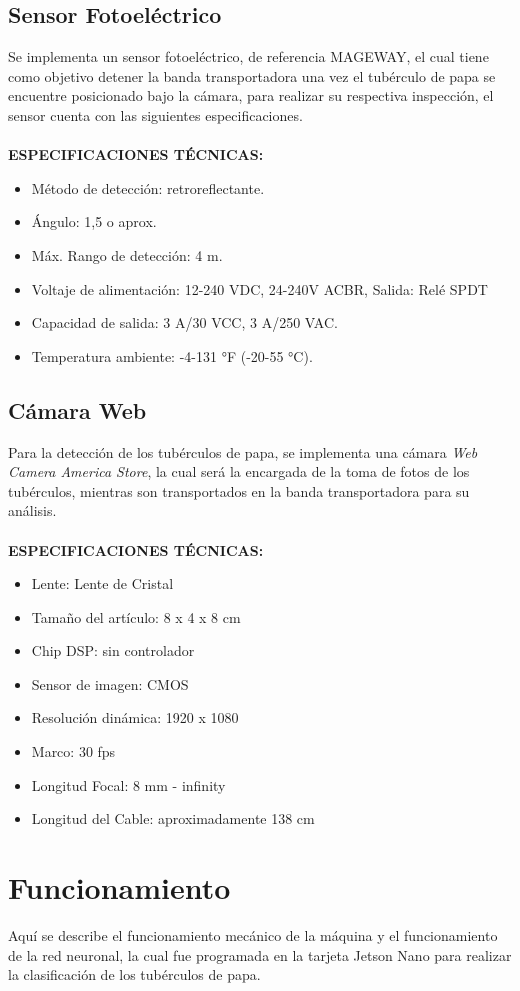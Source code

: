 \subsection{Sensor Fotoeléctrico}
Se implementa un sensor fotoeléctrico, de referencia MAGEWAY, el cual tiene como objetivo detener la banda transportadora una vez el tubérculo de papa se encuentre posicionado bajo la cámara, para realizar su respectiva inspección, el sensor cuenta con las siguientes especificaciones.
\\
\\
\textbf{ESPECIFICACIONES TÉCNICAS:}
\begin{itemize}
	\item Método de detección: retroreflectante.
	\item Ángulo: 1,5 o aprox.
	\item Máx. Rango de detección: 4 m.
	\item Voltaje de alimentación: 12-240 VDC, 24-240V ACBR, Salida: Relé SPDT
	\item Capacidad de salida: 3 A/30 VCC, 3 A/250 VAC.
	\item Temperatura ambiente: -4-131 °F (-20-55 °C).
\end{itemize}

\subsection{Cámara Web}
Para la detección de los tubérculos de papa, se implementa una cámara \textit{Web Camera America Store}, la cual será la encargada de la toma de fotos de los tubérculos, mientras son transportados en la banda transportadora para su análisis.
\\
\\
\textbf{ESPECIFICACIONES TÉCNICAS:}
\begin{itemize}
	\item Lente: Lente de Cristal
	\item Tamaño del artículo: 8 x 4 x 8 cm
	\item Chip DSP: sin controlador
	\item Sensor de imagen: CMOS
	\item Resolución dinámica: 1920 x 1080
	\item Marco: 30 fps
	\item Longitud Focal: 8 mm - infinity
	\item Longitud del Cable: aproximadamente 138 cm
\end{itemize}

\section{Funcionamiento}
Aquí se describe el funcionamiento mecánico de la máquina y el funcionamiento de la red neuronal, la cual fue programada en la tarjeta Jetson Nano para realizar la clasificación de los tubérculos de papa.

